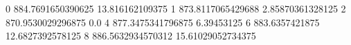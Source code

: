 0 884.7691650390625 13.816162109375
1 873.8117065429688 2.85870361328125
2 870.9530029296875 0.0
4 877.3475341796875 6.39453125
6 883.6357421875 12.6827392578125
8 886.5632934570312 15.61029052734375
